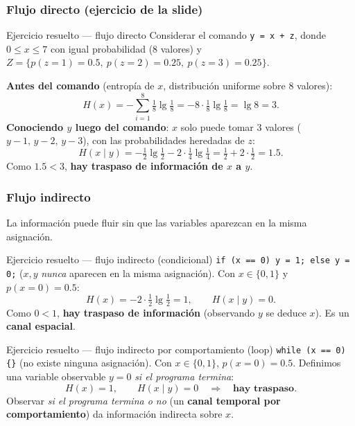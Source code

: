 \documentclass[11pt,a4paper]{article}
\newcommand{\Hentro}{H}
\begin{document}
\subsubsection{Flujo directo (ejercicio de la slide)}
\begin{practbox}{Ejercicio resuelto — flujo directo}
Considerar el comando \texttt{y = x + z}, donde $0 \le x \le 7$ con igual probabilidad
($8$ valores) y $Z=\{p(z{=}1)=0.5,\ p(z{=}2)=0.25,\ p(z{=}3)=0.25\}$.

\medskip
\textbf{Antes del comando} (entropía de $x$, distribución uniforme sobre $8$ valores):
\[
  \Hentro(x) = -\sum_{i=1}^{8} \tfrac{1}{8}\lg\tfrac{1}{8}
             = -8\cdot\tfrac{1}{8}\lg\tfrac{1}{8}
             = \lg 8 = \boxed{3}.
\]
\textbf{Conociendo $y$ luego del comando}: $x$ solo puede tomar $3$ valores ($y{-}1,\,y{-}2,\,y{-}3$),
con las probabilidades heredadas de $z$:
\[
  \Hentro(x \mid y) = -\tfrac{1}{2}\lg\tfrac{1}{2} - 2\cdot\tfrac{1}{4}\lg\tfrac{1}{4}
                    = \tfrac{1}{2} + 2\cdot\tfrac{1}{2} = \boxed{1.5}.
\]
Como $1.5 < 3$, \textbf{hay traspaso de información de $x$ a $y$}.
\end{practbox}

\subsubsection{Flujo indirecto}
La información puede fluir sin que las variables aparezcan en la misma asignación.

\begin{practbox}{Ejercicio resuelto — flujo indirecto (condicional)}
\texttt{if (x == 0) y = 1; else y = 0;} \quad ($x,y$ \emph{nunca} aparecen en la misma asignación).
Con $x\in\{0,1\}$ y $p(x{=}0)=0.5$:
\[
  \Hentro(x) = -2\cdot\tfrac{1}{2}\lg\tfrac{1}{2} = 1, \qquad
  \Hentro(x \mid y) = 0.
\]
Como $0 < 1$, \textbf{hay traspaso de información} (observando $y$ se deduce $x$). Es un
\textbf{canal espacial}.
\end{practbox}

\begin{practbox}{Ejercicio resuelto — flujo indirecto por comportamiento (loop)}
\texttt{while (x == 0) \{\}} \quad (no existe ninguna asignación). Con $x\in\{0,1\}$,
$p(x{=}0)=0.5$. Definimos una variable observable $y=0$ \emph{si el programa termina}:
\[
  \Hentro(x) = 1, \qquad \Hentro(x \mid y) = 0 \quad\Rightarrow\quad \textbf{hay traspaso}.
\]
Observar \emph{si el programa termina o no} (un \textbf{canal temporal por comportamiento}) da
información indirecta sobre $x$.
\end{practbox}
\end{document}
